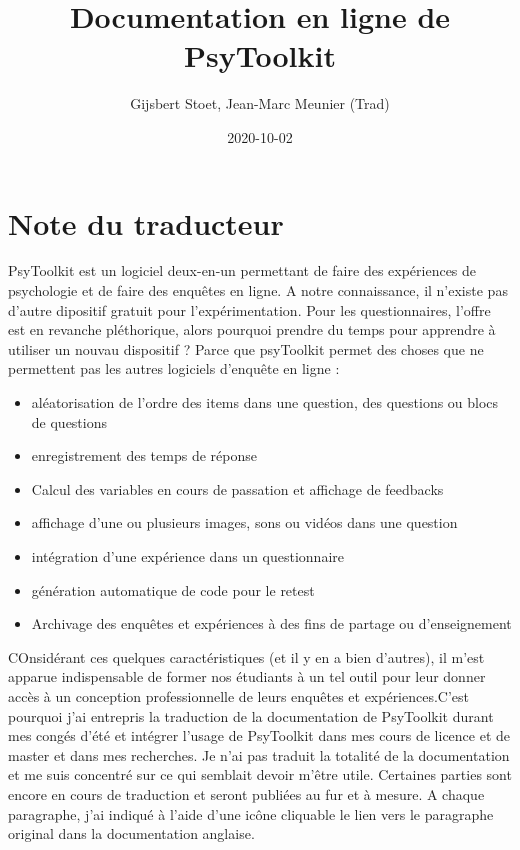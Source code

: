 \documentclass[
]{book}
\title{Documentation en ligne de PsyToolkit}
\author{Gijsbert Stoet, Jean-Marc Meunier (Trad)}
\date{2020-10-02}
\providecommand{\tightlist}{%
  \setlength{\itemsep}{0pt}\setlength{\parskip}{0pt}}
\begin{document}
\frontmatter
\maketitle

{
\setcounter{tocdepth}{1}
\tableofcontents
}
\mainmatter
\hypertarget{note-du-traducteur}{%
\chapter*{Note du traducteur}\label{note-du-traducteur}}

PsyToolkit est un logiciel deux-en-un permettant de faire des expériences de psychologie et de faire des enquêtes en ligne. A notre connaissance, il n'existe pas d'autre dipositif gratuit pour l'expérimentation. Pour les questionnaires, l'offre est en revanche pléthorique, alors pourquoi prendre du temps pour apprendre à utiliser un nouvau dispositif ? Parce que psyToolkit permet des choses que ne permettent pas les autres logiciels d'enquête en ligne :

\begin{itemize}
\tightlist
\item
  aléatorisation de l'ordre des items dans une question, des questions ou blocs de questions
\item
  enregistrement des temps de réponse
\item
  Calcul des variables en cours de passation et affichage de feedbacks
\item
  affichage d'une ou plusieurs images, sons ou vidéos dans une question
\item
  intégration d'une expérience dans un questionnaire
\item
  génération automatique de code pour le retest
\item
  Archivage des enquêtes et expériences à des fins de partage ou d'enseignement
\end{itemize}

COnsidérant ces quelques caractéristiques (et il y en a bien d'autres), il m'est apparue indispensable de former nos étudiants à un tel outil pour leur donner accès à un conception professionnelle de leurs enquêtes et expériences.C'est pourquoi j'ai entrepris la traduction de la documentation de PsyToolkit durant mes congés d'été et intégrer l'usage de PsyToolkit dans mes cours de licence et de master et dans mes recherches. Je n'ai pas traduit la totalité de la documentation et me suis concentré sur ce qui semblait devoir m'être utile. Certaines parties sont encore en cours de traduction et seront publiées au fur et à mesure. A chaque paragraphe, j'ai indiqué à l'aide d'une icône cliquable le lien vers le paragraphe original dans la documentation anglaise.
\end{document}
